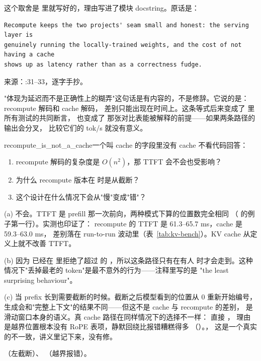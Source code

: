 这个取舍是  里就写好的，理由写进了模块 docstring。原话是：

\begin{lstlisting}[style=hlrepl]
Recompute keeps the two projects' seam small and honest: the serving layer is
genuinely running the locally-trained weights, and the cost of not having a cache
shows up as latency rather than as a correctness fudge.
\end{lstlisting}
\noindent 来源：:31--33，逐字手抄。

"体现为延迟而不是正确性上的糊弄"这句话是有内容的，不是修辞。它说的是：
recompute 解码和 cache 解码，
差别只能出现在时间上。这条等式后来变成了  里所有测试的共同断言，
也变成了  那张对比表能被解释的前提——如果两条路径的输出会分叉，
比较它们的 tok/s 就没有意义。

\begin{checkpoint}{recompute_is_not_a_cache}{一个叫 cache 的字段里没有 cache}
不看代码回答：
\begin{enumerate}[label=(\alph*)]
  \item recompute 解码的复杂度是 $O(n^2)$，那 TTFT 会不会也受影响？
  \item 为什么 recompute 版本在  时是从截断？
  \item 这个设计在什么情况下会从"慢"变成"错"？
\end{enumerate}

\ifshowanswers
\tcblower
\answer (a) 不会。TTFT 是 prefill 那一次前向，两种模式下算的位置数完全相同
（ 的例子第一行）。实测也印证了：
recompute 的 TTFT 是 61.3--65.7 ms，cache 是 59.3--63.0 ms，
差别落在 run-to-run 波动里（表~\ref{tab:kv-bench}）。KV cache 从定义上就不改善 TTFT。

(b) 因为  已经在  里拒绝了超过  的
，所以这条路径只有在有人
时才会走到。这种情况下"丢掉最老的 token"是最不意外的行为——注释里写的是
"the least surprising behaviour"。

(c) 当 prefix 长到需要截断的时候。截断之后模型看到的位置从 0 重新开始编号，
生成会和"完整上下文"的结果不同——但这不是 cache 与 recompute 的差别，
是滑动窗口本身的语义。真 cache 路径在同样情况下的选择不一样：
 直接 ，
理由是越界位置根本没有 RoPE 表项，静默回绕比报错糟糕得多
（）。，
这是一个真实的不一致，讲义里记下来，没有修。

\whereincode {}（左截断）、
（越界报错）。
\fi
\end{checkpoint}

